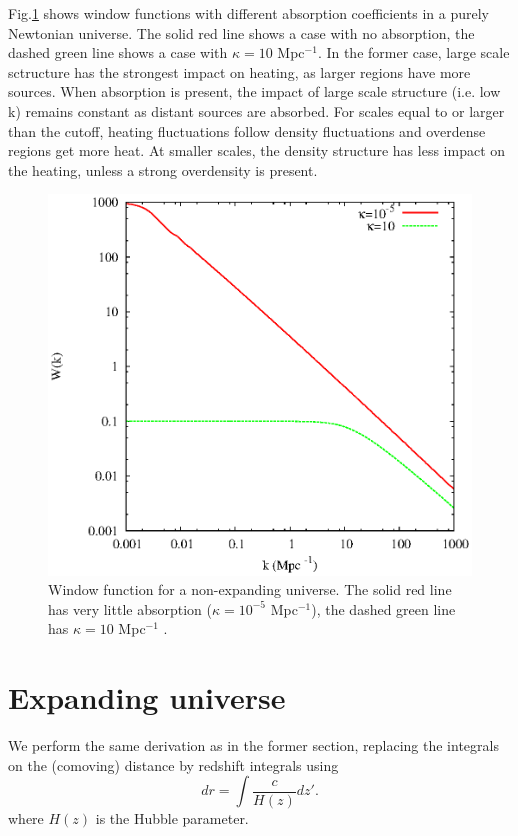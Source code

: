 \documentclass[twocolumns]{emulateapj}
\begin{document}
{Fig.\ref{fig:window_newt} shows  window functions with different absorption coefficients in a purely Newtonian universe. The solid red line shows a case with no absorption, the dashed green line shows a case with $\kappa=10$ Mpc$^{-1}$.  In the former case, large scale sctructure has the strongest impact on heating, as larger regions have more sources. When absorption is present,  the impact of large scale structure (i.e. low k) remains constant as distant sources are absorbed. For scales equal to or larger than the cutoff, heating fluctuations follow density fluctuations and overdense regions get more heat. At smaller scales, the density structure has less impact on the heating, unless a strong overdensity is present.  

\begin{figure}
  \centering
  \includegraphics[width = .45\textwidth ]{newtonian_window}
  \caption{Window function for a non-expanding universe. The solid red line has very little absorption ($\kappa=10^{-5}$ Mpc$^{-1}$), the dashed green line has $\kappa=10 $ Mpc$^{-1}$ .}
  \label{fig:window_newt}
\end{figure}



\section{Expanding universe}\label{sec:window_exp}

We perform the same derivation as in the former section, replacing the integrals on the (comoving) distance by redshift integrals using
\begin{equation}
  \label{eq:proper_dist}
  dr=\int \frac{c}{H(z)} dz'.
\end{equation}
where  $H(z)$ is the Hubble parameter.


}
\end{document}
